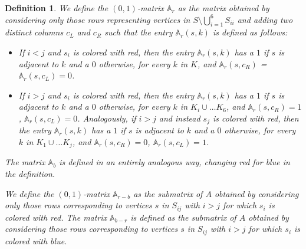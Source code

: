 \documentclass[12pt]{book}
\theoremstyle{plain}
\newtheorem{defn}[teo]{Definition}
\theoremstyle{remark}
\begin{document}
\begin{defn} \label{def:matrices_A_por_colores}
We define the $(0,1)$-matrix $\mathbb A_r$ as the matrix obtained by considering only those rows representing vertices in $S \setminus \bigcup_{i=1}^6 S_{ii}$ and adding two distinct columns $c_L$ and $c_R$ such that the entry $\mathbb A_r (s, k)$ is defined as follows:
\begin{itemize}
	\item If $i<j$ and $s_i$ is colored with red, then the entry $\mathbb A_r (s, k)$ has a $1$ if $s$ is adjacent to $k$ and a $0$ otherwise, for every $k$ in $K$, and $\mathbb A_r (s, c_R)$ = $\mathbb A_r (s, c_L) = 0$. 
	\item If $i>j$ and $s_i$ is colored with red, then the entry $\mathbb A_r (s, k)$ has a $1$ if $s$ is adjacent to $k$ and a $0$ otherwise, for every $k$ in $K_i \cup \ldots K_6$, and $\mathbb A_r (s, c_R) = 1$, $\mathbb A_r (s, c_L) = 0$. Analogously, if $i>j$ and instead $s_j$ is colored with red, then the entry $\mathbb A_r (s, k)$ has a $1$ if $s$ is adjacent to $k$ and a $0$ otherwise, for every $k$ in $K_1 \cup \ldots K_j$, and $\mathbb A_r (s, c_R) = 0$, $\mathbb A_r (s, c_L) = 1$.
\end{itemize}


The matrix $\mathbb A_b$ is defined in an entirely analogous way, changing red for blue in the definition. 


\vspace{2mm}
We define the $(0,1)$-matrix $\mathbb A_{r-b}$ as the submatrix of $A$ obtained by considering only those rows corresponding to vertices $s$ in $S_{ij}$ with $i>j$ for which $s_i$ is colored with red.
The matrix $\mathbb A_{b-r}$ is defined as the submatrix of $A$ obtained by considering those rows corresponding to vertices $s$ in $S_{ij}$ with $i>j$ for which $s_i$ is colored with blue.

\end{defn}


\end{document}
